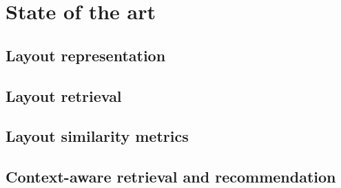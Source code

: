 \section{State of the art}

\subsection*{Layout representation}

\subsection*{Layout retrieval}

\subsection*{Layout similarity metrics}


\subsection*{Context-aware retrieval and recommendation}
